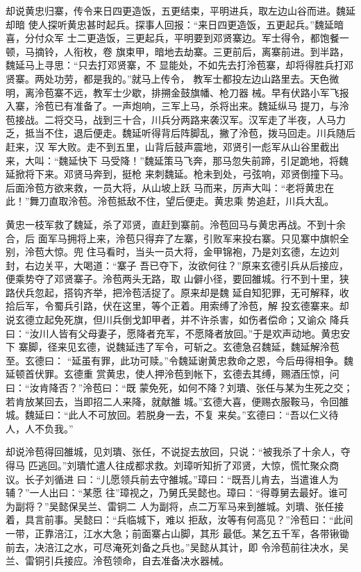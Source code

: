 却说黄忠归寨，传令来日四更造饭，五更结束，平明进兵，取左边山谷而进。魏延却暗
使人探听黄忠甚时起兵。探事人回报：“来日四更造饭，五更起兵。”魏延暗喜，分付众军
士二更造饭，三更起兵，平明要到邓贤寨边。军士得令，都饱餐一顿，马摘铃，人衔枚，卷
旗束甲，暗地去劫寨。三更前后，离寨前进。到半路，魏延马上寻思：“只去打邓贤寨，不
显能处，不如先去打泠苞寨，却将得胜兵打邓贤寨。两处功劳，都是我的。”就马上传令，
教军士都投左边山路里去。天色微明，离泠苞寨不远，教军士少歇，排搠金鼓旗幡、枪刀器
械。早有伏路小军飞报入寨，泠苞已有准备了。一声炮响，三军上马，杀将出来。魏延纵马
提刀，与泠苞接战。二将交马，战到三十合，川兵分两路来袭汉军。汉军走了半夜，人马力
乏，抵当不住，退后便走。魏延听得背后阵脚乱，撇了泠苞，拨马回走。川兵随后赶来，汉
军大败。走不到五里，山背后鼓声震地，邓贤引一彪军从山谷里截出来，大叫：“魏延快下
马受降！”魏延策马飞奔，那马忽失前蹄，引足跪地，将魏延掀将下来。邓贤马奔到，挺枪
来刺魏延。枪未到处，弓弦响，邓贤倒撞下马。后面泠苞方欲来救，一员大将，从山坡上跃
马而来，厉声大叫：“老将黄忠在此！”舞刀直取泠苞。泠苞抵敌不住，望后便走。黄忠乘
势追赶，川兵大乱。

黄忠一枝军救了魏延，杀了邓贤，直赶到寨前。泠苞回马与黄忠再战。不到十余合，后
面军马拥将上来，泠苞只得弃了左寨，引败军来投右寨。只见寨中旗帜全别，泠苞大惊。兜
住马看时，当头一员大将，金甲锦袍，乃是刘玄德，左边刘封，右边关平，大喝道：“寨子
吾已夺下，汝欲何往？”原来玄德引兵从后接应，便乘势夺了邓贤寨子。泠苞两头无路，取
山僻小径，要回雒城。行不到十里，狭路伏兵忽起，搭钩齐举，把泠苞活捉了。原来却是魏
延自知犯罪，无可解释，收拾后军，令蜀兵引路，伏在这里，等个正着。用索缚了泠苞，解
投玄德寨来。却说玄德立起免死旗，但川兵倒戈卸甲者，并不许杀害，如伤者偿命；又谕众
降兵曰：“汝川人皆有父母妻子，愿降者充军，不愿降者放回。”于是欢声动地。黄忠安下
寨脚，径来见玄德，说魏延违了军令，可斩之。玄德急召魏延，魏延解泠苞至。玄德曰：
“延虽有罪，此功可赎。”令魏延谢黄忠救命之恩，今后毋得相争。魏延顿首伏罪。玄德重
赏黄忠，使人押泠苞到帐下，玄德去其缚，赐酒压惊，问曰：“汝肯降否？”泠苞曰：“既
蒙免死，如何不降？刘璝、张任与某为生死之交；若肯放某回去，当即招二人来降，就献雒
城。”玄德大喜，便赐衣服鞍马，令回雒城。魏延曰：“此人不可放回。若脱身一去，不复
来矣。”玄德曰：“吾以仁义待人，人不负我。”

却说泠苞得回雒城，见刘璝、张任，不说捉去放回，只说：“被我杀了十余人，夺得马
匹逃回。”刘璝忙遣人往成都求救。刘璋听知折了邓贤，大惊，慌忙聚众商议。长子刘循进
曰：“儿愿领兵前去守雒城。”璋曰：“既吾儿肯去，当遣谁人为辅？”一人出曰：“某愿
往”璋视之，乃舅氏吴懿也。璋曰：“得尊舅去最好。谁可为副将？”吴懿保吴兰、雷铜二
人为副将，点二万军马来到雒城。刘璝、张任接着，具言前事。吴懿曰：“兵临城下，难以
拒敌，汝等有何高见？”泠苞曰：“此间一带，正靠涪江，江水大急；前面寨占山脚，其形
最低。某乞五千军，各带锹锄前去，决涪江之水，可尽淹死刘备之兵也。”吴懿从其计，即
令泠苞前往决水，吴兰、雷铜引兵接应。泠苞领命，自去准备决水器械。

